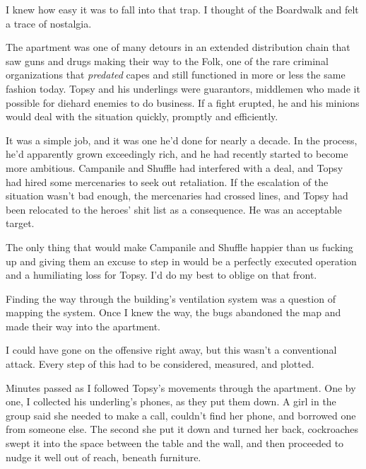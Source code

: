 I knew how easy it was to fall into that trap.  I thought of the Boardwalk and felt a trace of nostalgia.



The apartment was one of many detours in an extended distribution chain that saw guns and drugs making their way to the Folk, one of the rare criminal organizations that \emph{predated} capes and still functioned in more or less the same fashion today.  Topsy and his underlings were guarantors, middlemen who made it possible for diehard enemies to do business.  If a fight erupted, he and his minions would deal with the situation quickly, promptly and efficiently.



It was a simple job, and it was one he'd done for nearly a decade.  In the process, he'd apparently grown exceedingly rich, and he had recently started to become more ambitious.  Campanile and Shuffle had interfered with a deal, and Topsy had hired some mercenaries to seek out retaliation.  If the escalation of the situation wasn't bad enough, the mercenaries had crossed lines, and Topsy had been relocated to the heroes' shit list as a consequence.  He was an acceptable target.



The only thing that would make Campanile and Shuffle happier than us fucking up and giving them an excuse to step in would be a perfectly executed operation and a humiliating loss for Topsy.  I'd do my best to oblige on that front.



Finding the way through the building's ventilation system was a question of mapping the system.  Once I knew the way, the bugs abandoned the map and made their way into the apartment.



I could have gone on the offensive right away, but this wasn't a conventional attack.  Every step of this had to be considered, measured, and plotted.



Minutes passed as I followed Topsy's movements through the apartment.  One by one, I collected his underling's phones, as they put them down.  A girl in the group said she needed to make a call, couldn't find her phone, and borrowed one from someone else.  The second she put it down and turned her back, cockroaches swept it into the space between the table and the wall, and then proceeded to nudge it well out of reach, beneath furniture.



